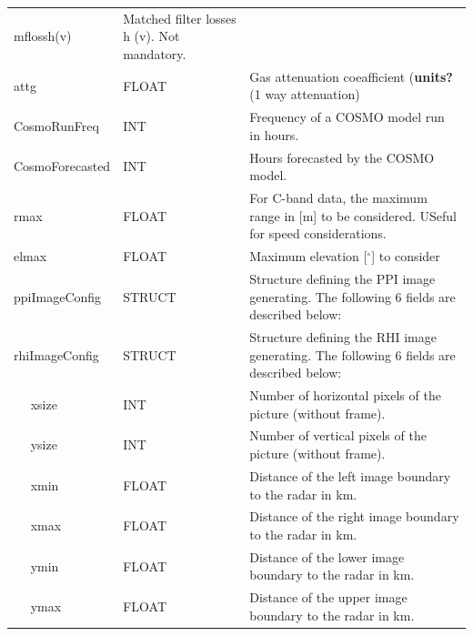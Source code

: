\documentclass[a4paper,11pt,pdftex,twoside]{scrartcl}
\renewcommand{\bf}{\normalfont \bfseries}
\begin{document}
{{{\begin{longtable}{p{}p{}p{}}
mflossh(v)            & Matched filter losses h (v). Not mandatory. \\
attg                & FLOAT & Gas attenuation coeafficient ({\bf units?} (1 way attenuation) \\                                
CosmoRunFreq & INT &  Frequency of a COSMO model run in hours.\\
CosmoForecasted & INT & Hours forecasted by the COSMO model.\\
rmax            & FLOAT & For C-band data, the maximum range in [m] to be considered. USeful for speed
                                 considerations.   \\
elmax           & FLOAT & Maximum elevation [$^\circ$] to consider  \\                                 
ppiImageConfig     & STRUCT    & Structure defining the PPI image generating. The following 6
                                 fields are described below:\\
rhiImageConfig     & STRUCT    & Structure defining the RHI image generating. The following 6
                                 fields are described below:\\
$\quad$ xsize      & INT       & Number of horizontal pixels of the picture (without frame).\\
$\quad$ ysize      & INT       & Number of vertical pixels of the picture (without frame).\\
$\quad$ xmin       & FLOAT     & Distance of the left image boundary to the radar in km.\\
$\quad$ xmax       & FLOAT     & Distance of the right image boundary to the radar in km.\\
$\quad$ ymin       & FLOAT     & Distance of the lower image boundary to the radar in km.\\
$\quad$ ymax       & FLOAT     & Distance of the upper image boundary to the radar in km.\\


\end{longtable}}}}
\end{document}
